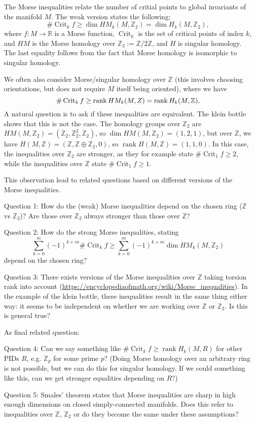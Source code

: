 \documentclass[a4paper]{article}
\newcommand\R{\mathbb R}
\begin{document}
The Morse inequalities relate the number of critial points to global invariants of the manifold $M$.
The weak version states the following:
\[
    \# \operatorname{Crit}_k f \ge  \dim HM_k(M, \mathbb Z_2) = \dim H_k(M, \mathbb Z_2)
,\] 
where $f: M \to  \R$ is a Morse function, $\operatorname{Crit}_k$ is the set of critical points of index $k$, and $HM$ is the Morse homology over  $\mathbb Z_2 := \mathbb Z / 2 \mathbb Z$, and $H$ is singular homology. The last equality follows from the fact that Morse homology is isomorphic to singular homology.

We often also consider Morse/singular homology over $\mathbb Z$ (this involves choosing orientations, but does not require $M$ itself being oriented), where we have
\[ 
    \# \operatorname{Crit}_k f \ge  \operatorname{rank} HM_k(M, \mathbb \mathbb Z) = \operatorname{rank} H_k(M, \mathbb Z)
.\] 
A natural question is to ask if these inequalities are equivalent. The klein bottle shows that this is not the case. The homology groups over $\mathbb Z_2$ are $HM(M, \mathbb Z_2) = (\mathbb Z_2, \mathbb Z_2^2, \mathbb Z_2)$, so $\dim HM(M, \mathbb Z_2) = (1, 2, 1)$, but over $ \mathbb Z$, we have $H(M, \mathbb Z) = (\mathbb Z, \mathbb Z \oplus \mathbb Z_2, 0)$, so $\operatorname{rank} H(M, \mathbb Z) = (1, 1, 0)$.
In this case, the inequalities over $\mathbb Z_2$ are stronger, as they for example state $\# \operatorname{Crit}_1 f \ge  2$, while the inequalities over $\mathbb Z$ state $\# \operatorname{Crit}_1 f \ge  1$.

This observation lead to related questions based on different versions of the Morse inequalities.

Question 1: How do the (weak) Morse inequalities depend on the chosen ring ($\mathbb Z$ vs $\mathbb Z_2$)? Are those over $\mathbb Z_2$ always stronger than those over $\mathbb Z$?

Question 2: How do the strong Morse inequalities, stating \[
\sum_{k=0}^{m} (-1)^{k+m} \# \operatorname{Crit}_k f\ge  \sum_{k=0}^{m} (-1)^{k+m} \dim HM_k(M, \mathbb Z_2)
\] depend on the chosen ring?

Question 3: There exists versions of the Morse inequalities over $\mathbb Z$ taking torsion rank into account (\url{https://encyclopediaofmath.org/wiki/Morse_inequalities}). In the example of the klein bottle, these inequalities result in the same thing either way: it seems to be independent on whether we are working over $\mathbb Z$ or $\mathbb Z_2$. Is this is general true?

As final related question:

Question 4: Can we say something like $\# \operatorname{Crit}_k f \ge  \operatorname{rank} H_k(M, R)$ for other PIDs $R$, e.g. $\mathbb Z_p$ for some prime $p$? (Doing Morse homology over an arbitrary ring is not possible, but we can do this for singular homology. If we could something like this, can we get stronger equalities depending on $R$?)

Question 5: Smales' theorem states that Morse inequalities are sharp in high enough dimensions on closed simply-connected manifolds. Does this refer to inequalities over $\mathbb Z$, $\mathbb Z_2$ or do they become the same under these assumptions?
\end{document}
